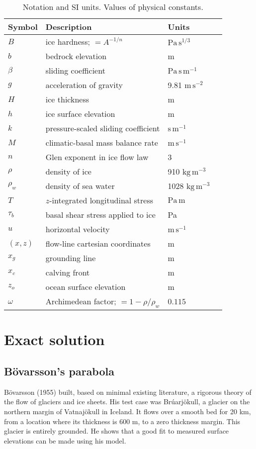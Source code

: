 \documentclass[twocolumn,letterpaper]{igs}
\renewcommand{\dh}{\fontencoding{T1}\selectfont{\symbol{240}}}
\newcommand{\bod}{B\"o\dh varsson\xspace}
\newcommand{\citebod}{B\"o\dh varsson (1955)\nocite{Bodvardsson}\xspace}
\begin{document}
\begin{table}
\caption{Notation and SI units.  Values of physical constants.}\label{tab:notation}

\medskip
\begin{tabular}{llll}
Symbol & Description & Units \\ \hline
$B$ & ice hardness; $=A^{-1/n}$ & $\text{Pa}\,\text{s}^{1/3}$  \\
$b$ & bedrock elevation & m \\
$\beta$ & sliding coefficient & $\text{Pa}\,\text{s}\,\text{m}^{-1}$ \\
$g$ & acceleration of gravity  & 9.81 $\text{m}\,\text{s}^{-2}$\\
$H$ & ice thickness & m \\
$h$ & ice surface elevation & m \\
$k$ & pressure-scaled sliding coefficient  & $\text{s}\,\text{m}^{-1}$ \\
$M$ & climatic-basal mass balance rate & $\text{m}\,\text{s}^{-1}$ \\
$n$ & Glen exponent in ice flow law & 3 \\
$\rho$ & density of ice & 910 $\text{kg}\,\text{m}^{-3}$ \\
$\rho_w$ & density of sea water & 1028 $\text{kg}\,\text{m}^{-3}$ \\
$T$ & $z$-integrated longitudinal stress & $\text{Pa}\,\text{m}$ \\
$\tau_{b}$ & basal shear stress applied to ice & Pa \\
$u$ & horizontal velocity & $\text{m}\,\text{s}^{-1}$ \\
$(x,z)$ & flow-line cartesian coordinates & m  \\
$x_g$ & grounding line & m  \\
$x_c$ & calving front & m  \\
$z_o$ & ocean surface elevation & m \\
$\omega$ & Archimedean factor; $=1 - \rho/\rho_w$ & $0.115$
\end{tabular}
\end{table}


\section{Exact solution}

\subsection*{\bod's parabola}  \citebod built, based on minimal existing literature, a rigorous theory of the flow of glaciers and ice sheets.  His test case was Br\'uarj\"okull, a glacier on the northern margin of Vatnaj\"okull in Iceland.  It flows over a smooth bed for 20 km, from a location where its thickness is 600 m, to a zero thickness margin.  This glacier is entirely grounded.  He shows that a good fit to measured surface elevations can be made using his model.
\end{document}
